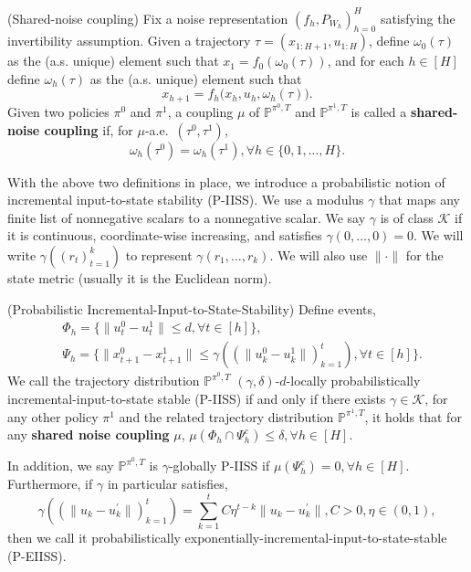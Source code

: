 \documentclass{article}
\begin{document}
 

\begin{definition}(\textnormal{Shared-noise coupling})
Fix a noise representation $(f_h,P_{W_h})_{h=0}^H$ satisfying the invertibility assumption.
Given a trajectory $\tau=(x_{1:H+1},u_{1:H})$, define $\omega_0(\tau)$ as the (a.s. unique) element such that
$x_1=f_0(\omega_0(\tau))$, and for each $h\in[H]$ define $\omega_h(\tau)$ as the (a.s. unique) element such that
\begin{equation*}
x_{h+1}=f_h\big(x_h,u_h,\omega_h(\tau)\big).
\end{equation*}
Given two policies $\pi^0$ and $\pi^1$, a coupling $\mu$ of $\mathbb P^{\pi^0,T}$ and $\mathbb P^{\pi^1,T}$
is called a \textbf{shared-noise coupling} if, for $\mu$-a.e.\ $(\tau^0,\tau^1)$,
\begin{equation*}
\omega_h(\tau^0)=\omega_h(\tau^1),\forall h\in\{0,1,\ldots,H\}.
\end{equation*}
\end{definition}






With the above two definitions in place, we introduce a probabilistic notion of incremental input-to-state stability (P-IISS). We use a modulus $\gamma$ that maps any finite list of nonnegative scalars to a nonnegative scalar. 
We say $\gamma$ is of class $\mathcal K$ if it is continuous, coordinate-wise increasing, and satisfies $\gamma(0,\ldots,0)=0$. We will write $\gamma\left((r_t)_{t=1}^k\right)$ to represent $\gamma(r_1,\ldots,r_k)$. We will also use $\|\cdot\|$ for the state metric (usually it is the Euclidean norm).


\begin{definition}\label{def:P-IISS}(\textnormal{Probabilistic Incremental-Input-to-State-Stability)} Define events,
\begin{align*} 
&\Phi_h = \{\|u_t^0-u_t^1\|\leq d, \forall t\in[h]\}, \\
&\Psi_h = \{\|x_{t+1}^0-x_{t+1}^1\|\leq \gamma\left((\|u^0_k-u^1_k\|)_{k=1}^t\right),\forall t\in[h]\}. 
\end{align*} 
We call the trajectory distribution $\mathbb P^{\pi^0, T}$ $(\gamma, \delta)$-$d$-locally probabilistically incremental-input-to-state stable (P-IISS) if and only if there exists $\gamma\in \mathcal K$, for any other policy $\pi^1$ and the related trajectory distribution $\mathbb P^{\pi^1, T}$,  it holds that for any \textbf{shared noise coupling} $\mu$, $\mu(\Phi_h\cap \Psi_h^c)\leq \delta, \forall h\in[H]$.

In addition, we say $\mathbb P^{\pi^0, T}$ is $\gamma$-globally P-IISS if $\mu(\Psi_h^c)=0,\forall h\in[H]$. Furthermore, if $\gamma$ in particular satisfies,
\begin{equation*}
        \gamma\left((\|u_k-u_k^\prime\|)_{k=1}^t\right)=\sum_{k=1}^t C\eta^{t-k}\|u_k-u_k^\prime\|, C>0, \eta\in (0,1),
\end{equation*}
then we call it probabilistically exponentially-incremental-input-to-state-stable (P-EIISS).
\end{definition}
\end{document}

